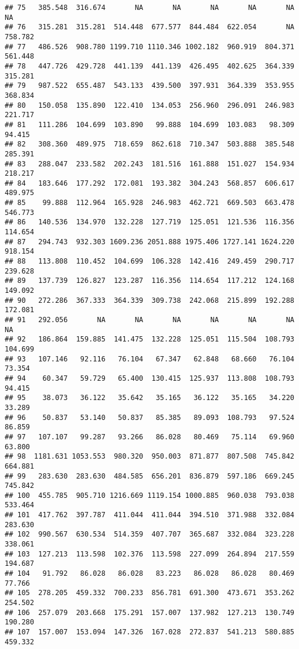 \documentclass[
]{article}
\begin{document}
\begin{verbatim}
## 75   385.548  316.674       NA       NA       NA       NA       NA       NA
## 76   315.281  315.281  514.448  677.577  844.484  622.054       NA  758.782
## 77   486.526  908.780 1199.710 1110.346 1002.182  960.919  804.371  561.448
## 78   447.726  429.728  441.139  441.139  426.495  402.625  364.339  315.281
## 79   987.522  655.487  543.133  439.500  397.931  364.339  353.955  368.834
## 80   150.058  135.890  122.410  134.053  256.960  296.091  246.983  221.717
## 81   111.286  104.699  103.890   99.888  104.699  103.083   98.309   94.415
## 82   308.360  489.975  718.659  862.618  710.347  503.888  385.548  285.391
## 83   288.047  233.582  202.243  181.516  161.888  151.027  154.934  218.217
## 84   183.646  177.292  172.081  193.382  304.243  568.857  606.617  489.975
## 85    99.888  112.964  165.928  246.983  462.721  669.503  663.478  546.773
## 86   140.536  134.970  132.228  127.719  125.051  121.536  116.356  114.654
## 87   294.743  932.303 1609.236 2051.888 1975.406 1727.141 1624.220  918.154
## 88   113.808  110.452  104.699  106.328  142.416  249.459  290.717  239.628
## 89   137.739  126.827  123.287  116.356  114.654  117.212  124.168  149.092
## 90   272.286  367.333  364.339  309.738  242.068  215.899  192.288  172.081
## 91   292.056       NA       NA       NA       NA       NA       NA       NA
## 92   186.864  159.885  141.475  132.228  125.051  115.504  108.793  104.699
## 93   107.146   92.116   76.104   67.347   62.848   68.660   76.104   73.354
## 94    60.347   59.729   65.400  130.415  125.937  113.808  108.793   94.415
## 95    38.073   36.122   35.642   35.165   36.122   35.165   34.220   33.289
## 96    50.837   53.140   50.837   85.385   89.093  108.793   97.524   86.859
## 97   107.107   99.287   93.266   86.028   80.469   75.114   69.960   63.800
## 98  1181.631 1053.553  980.320  950.003  871.877  807.508  745.842  664.881
## 99   283.630  283.630  484.585  656.201  836.879  597.186  669.245  745.842
## 100  455.785  905.710 1216.669 1119.154 1000.885  960.038  793.038  533.464
## 101  417.762  397.787  411.044  411.044  394.510  371.988  332.084  283.630
## 102  990.567  630.534  514.359  407.707  365.687  332.084  323.228  338.061
## 103  127.213  113.598  102.376  113.598  227.099  264.894  217.559  194.687
## 104   91.792   86.028   86.028   83.223   86.028   86.028   80.469   77.766
## 105  278.205  459.332  700.233  856.781  691.300  473.671  353.262  254.502
## 106  257.079  203.668  175.291  157.007  137.982  127.213  130.749  190.280
## 107  157.007  153.094  147.326  167.028  272.837  541.213  580.885  459.332

\end{verbatim}
\end{document}
